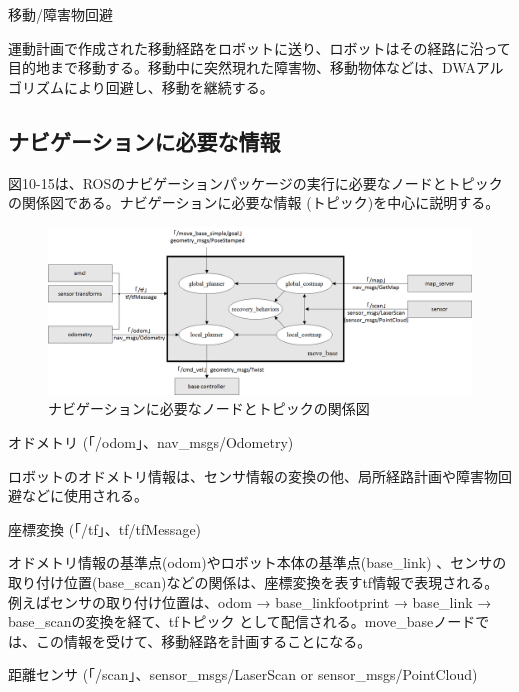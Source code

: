 \circled{\thenum} 移動/障害物回避

運動計画で作成された移動経路をロボットに送り、ロボットはその経路に沿って目的地まで移動する。移動中に突然現れた障害物、移動物体などは、DWAアルゴリズムにより回避し、移動を継続する。

\subsection{ナビゲーションに必要な情報}

図10-15は、ROSのナビゲーションパッケージの実行に必要なノードとトピックの関係図である。ナビゲーションに必要な情報 (トピック)を中心に説明する。

\begin{figure}[ht]
  \centering
  \includegraphics[width=\columnwidth]{pictures/chapter10/pic_10_15.png}
  \caption{ナビゲーションに必要なノードとトピックの関係図}
\end{figure}

\setcounter{num}{0}

\circled{\thenum} オドメトリ (「/odom」、nav\_msgs/Odometry)

ロボットのオドメトリ情報は、センサ情報の変換の他、局所経路計画や障害物回避などに使用される。

\circled{\thenum} 座標変換 (「/tf」、tf/tfMessage)

オドメトリ情報の基準点(odom)やロボット本体の基準点(base\_link)  、センサの取り付け位置(base\_scan)などの関係は、座標変換を表すtf情報で表現される。例えばセンサの取り付け位置は、odom → base\_linkfootprint → base\_link → base\_scanの変換を経て、tfトピック  として配信される。move\_baseノードでは、この情報を受けて、移動経路を計画することになる。

\circled{\thenum} 距離センサ (「/scan」、sensor\_msgs/LaserScan or sensor\_msgs/PointCloud)

